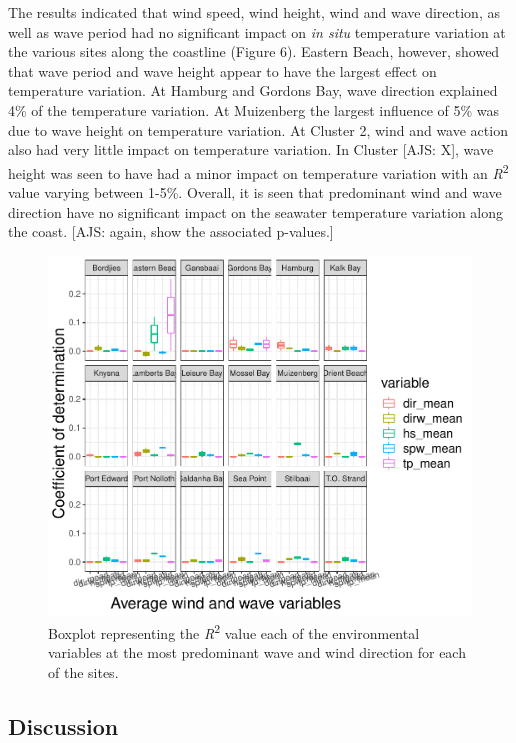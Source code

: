 \documentclass[12pt,A4paper,]{article}
\begin{document}
The results indicated that wind speed, wind height, wind and wave
direction, as well as wave period had no significant impact on \emph{in
situ} temperature variation at the various sites along the coastline
(Figure 6). Eastern Beach, however, showed that wave period and wave
height appear to have the largest effect on temperature variation. At
Hamburg and Gordons Bay, wave direction explained 4\% of the temperature
variation. At Muizenberg the largest influence of 5\% was due to wave
height on temperature variation. At Cluster 2, wind and wave action also
had very little impact on temperature variation. In Cluster {[}AJS:
X{]}, wave height was seen to have had a minor impact on temperature
variation with an \emph{R}\textsuperscript{2} value varying between
1-5\%. Overall, it is seen that predominant wind and wave direction have
no significant impact on the seawater temperature variation along the
coast. {[}AJS: again, show the associated p-values.{]}

\begin{figure}
\centering
\includegraphics{../figures/predominant_ww.pdf}
\caption{Boxplot representing the \emph{R}\textsuperscript{2} value each
of the environmental variables at the most predominant wave and wind
direction for each of the sites.}
\end{figure}

\subsection{Discussion}\label{discussion}
\end{document}
